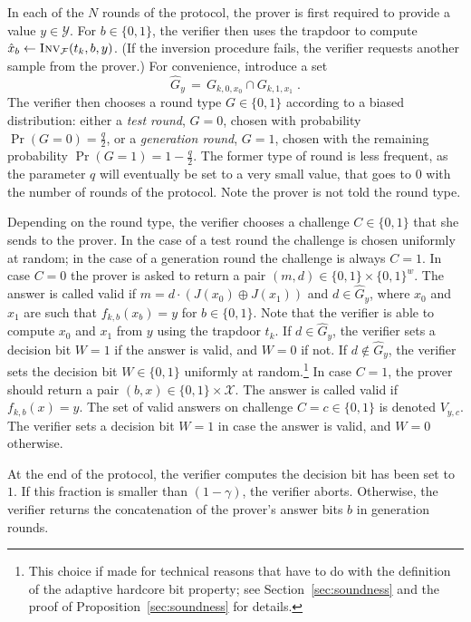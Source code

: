 \documentclass[11pt]{article}
\theoremstyle{remark}
\theoremstyle{definition}
\newcommand{\mF}{\ensuremath{\mathcal{F}}}
\newcommand{\mX}{\ensuremath{\mathcal{X}}}
\newcommand{\mY}{\ensuremath{\mathcal{Y}}}
\newcommand{\Inv}{\ensuremath{\textsc{Inv}}}
\newcommand{\dset}{G}
\newcommand{\inj}{J}
\begin{document}
In each of the $N$ rounds of the protocol, the prover is first required to provide a value $y\in\mY$. For $b\in\{0,1\}$, the verifier then uses the trapdoor to compute $\hat{x}_b\leftarrow \Inv_\mF(t_k,b,y)$. (If the inversion procedure fails, the verifier requests another sample from the prover.) For convenience, introduce a set 
\begin{equation}\label{eq:def-gy}
 \hat{\dset}_y \,=\, \dset_{k,0,x_0} \cap \dset_{k,1,x_1}\;.
\end{equation}
The verifier then chooses a round type $G\in\{0,1\}$ according to a biased distribution: either a \emph{test round}, $G=0$, chosen with probability $\Pr(G=0)=\frac{q}{2}$, or a \emph{generation round}, $G=1$, chosen with the remaining probability $\Pr(G=1)=1-\frac{q}{2}$. The former type of round is less frequent, as the parameter $q$ will eventually be set to a very small value, that goes to $0$ with the number of rounds of the protocol. Note the prover is not told the round type. 

Depending on the round type, the verifier chooses a challenge $C\in\{0,1\}$ that she sends to the prover. In the case of a test round the challenge is chosen uniformly at random; in the case of a generation round the challenge is always $C=1$. In case $C=0$ the prover is asked to return a pair $(m,d)\in \{0,1\}\times\{0,1\}^w$. The answer is called valid if $m=d\cdot(\inj(x_0)\oplus \inj(x_1))$ and $d\in\hat{\dset}_{y}$, where $x_0$ and $x_1$ are such that $f_{k,b}(x_b)=y$ for $b\in \{0,1\}$. Note that the verifier is able to compute $x_0$ and $x_1$ from $y$ using the trapdoor $t_k$. If $d\in\hat{\dset}_y$, the verifier sets a decision bit $W=1$ if the answer is valid, and $W=0$ if not. If $d\notin \hat{\dset}_y$, the verifier sets the decision bit $W\in\{0,1\}$ uniformly at random.\footnote{This choice if made for technical reasons that have to do with the definition of the adaptive hardcore bit property; see Section~\ref{sec:soundness} and the proof of Proposition~\ref{sec:soundness} for details.}
In case $C=1$, the prover should return  a pair $(b,x)\in \{0,1\}\times\mX$. The answer is called valid if $f_{k,b}(x)=y$. The set of valid answers on challenge $C=c\in\{0,1\}$ is denoted $V_{y,c}$. The verifier sets a decision bit $W=1$ in case the answer is valid, and $W=0$ otherwise. 

At the end of the protocol, the verifier computes the decision bit has been set to $1$. If this fraction is smaller than $(1-\gamma)$, the verifier aborts. Otherwise, the verifier returns the concatenation of the prover's answer bits $b$ in generation rounds.
\end{document}
